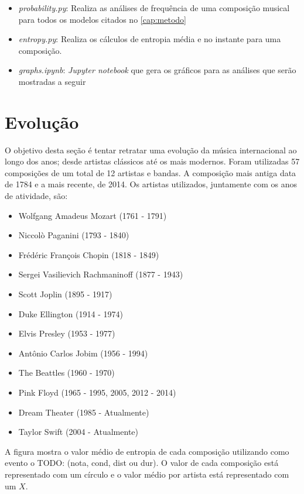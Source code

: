 \begin{itemize}
    \item \textit{probability.py}: Realiza as análises de frequência de uma composição musical para todos os modelos citados no \ref{cap:metodo}
    \item \textit{entropy.py}: Realiza os cálculos de entropia média e no instante para uma composição.
    \item \textit{graphs.ipynb}: \textit{Jupyter notebook} que gera os gráficos para as análises que serão mostradas a seguir
\end{itemize}

\section{Evolução}

O objetivo desta seção é tentar retratar uma evolução da música internacional ao longo dos anos; desde artistas clássicos até os mais modernos. Foram utilizadas 57 composições de um total de 12 artistas e bandas. A composição mais antiga data de 1784 e a mais recente, de 2014. Os artistas utilizados, juntamente com os anos de atividade, são:

\begin{itemize}
    \item Wolfgang Amadeus Mozart (1761 - 1791) \cite{midiworld}
    \item Niccolò Paganini (1793 - 1840) \cite{midimelody}
    \item Frédéric François Chopin (1818 - 1849) \cite{midiworld}
    \item Sergei Vasilievich Rachmaninoff (1877 - 1943) \cite{midiworld}
    \item Scott Joplin (1895 - 1917) \cite{trachtman}
    \item Duke Ellington (1914 - 1974) \cite{midimelody}
    \item Elvis Presley (1953 - 1977) \cite{midiworld}
    \item Antônio Carlos Jobim (1956 - 1994) \cite{wersi}
    \item The Beattles (1960 - 1970) \cite{midiworld}
    \item Pink Floyd (1965 - 1995, 2005, 2012 - 2014) \cite{midiworld}
    \item Dream Theater (1985 - Atualmente) \cite{freemidi}
    \item Taylor Swift (2004 - Atualmente) \cite{freemidi}
\end{itemize}
A figura
mostra o valor médio de entropia de cada composição utilizando como evento o TODO: (nota, cond, dist ou dur). O valor de cada composição está representado com um círculo e o valor médio por artista está representado com um $X$. 

